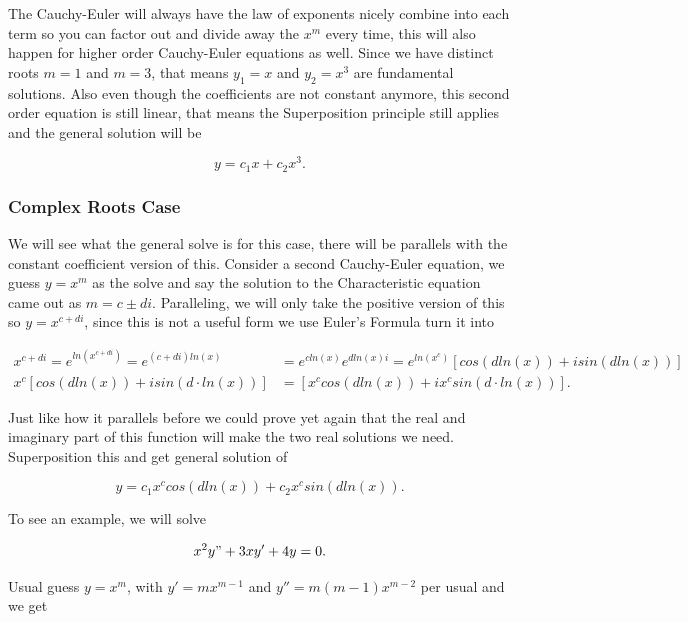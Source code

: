 \documentclass[12pt]{article}
\begin{document}
The Cauchy-Euler will always have the law of exponents nicely combine into each term so you can factor out and divide away the $x^m$ every time, this will also happen for higher order Cauchy-Euler equations as well. Since we have distinct roots $m=1$ and $m=3$, that means $y_1=x$ and $y_2=x^3$ are fundamental solutions. Also even though the coefficients are not constant anymore, this second order equation is still linear, that means the Superposition principle still applies and the general solution will be

\begin{equation*}
    y=c_1x+c_2x^3.    
\end{equation*}

\subsubsection{Complex Roots Case}

We will see what the general solve is for this case, there will be parallels with the constant coefficient version of this. Consider a second Cauchy-Euler equation, we guess $y=x^m$ as the solve and say the solution to the Characteristic equation came out as $m=c\pm di$. Paralleling, we will only take the positive version of this so $y=x^{c+di}$, since this is not a useful form we use Euler's Formula turn it into

\begin{align*}
    x^{c+di} = e^{ln\left(x^{c+di}\right)} = e^{(c+di)ln(x)} &= e^{cln(x)}e^{dln(x)i} = e^{ln(x^c)}[cos(dln(x))+isin(dln(x))] \\
    x^c[cos(dln(x))+isin(d\cdot ln(x))] &= [x^c cos(dln(x))+i x^c sin(d\cdot ln(x))].
\end{align*}

Just like how it parallels before we could prove yet again that the real and imaginary part of this function will make the two real solutions we need. Superposition this and get general solution of

\begin{equation*}
    y=c_1 x^c cos(dln(x)) + c_2 x^c sin(dln(x)).
\end{equation*}

To see an example, we will solve

\begin{equation*}
    x^2y"+3xy'+4y=0.
\end{equation*}

Usual guess $y=x^m$, with $y'=mx^{m-1}$ and $y''=m(m-1)x^{m-2}$ per usual and we get
\end{document}
